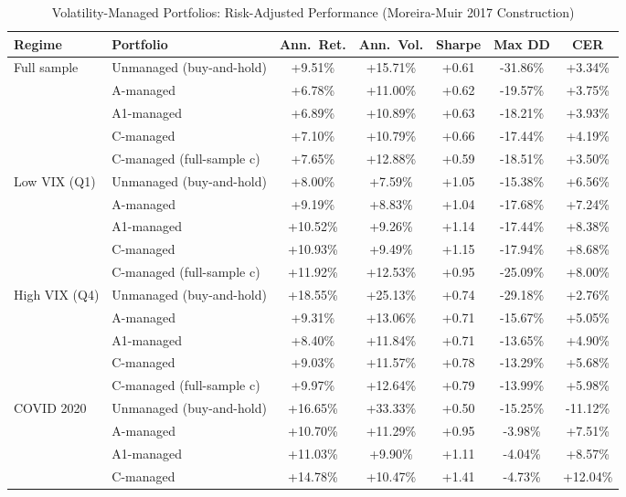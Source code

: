 
\begin{table}[htbp]
\centering
\caption{Volatility-Managed Portfolios: Risk-Adjusted Performance (Moreira-Muir 2017 Construction)}
\label{tab:volmanaged}
\small
\begin{tabular}{llccccc}
\toprule
Regime & Portfolio & Ann.\ Ret. & Ann.\ Vol. & Sharpe & Max DD & CER \\
\midrule
Full sample & Unmanaged (buy-and-hold) & +9.51\% & +15.71\% & +0.61 & -31.86\% & +3.34\% \\
 & A-managed & +6.78\% & +11.00\% & +0.62 & -19.57\% & +3.75\% \\
 & A1-managed & +6.89\% & +10.89\% & +0.63 & -18.21\% & +3.93\% \\
 & C-managed & +7.10\% & +10.79\% & +0.66 & -17.44\% & +4.19\% \\
 & C-managed (full-sample c) & +7.65\% & +12.88\% & +0.59 & -18.51\% & +3.50\% \\
\midrule
Low VIX (Q1) & Unmanaged (buy-and-hold) & +8.00\% & +7.59\% & +1.05 & -15.38\% & +6.56\% \\
 & A-managed & +9.19\% & +8.83\% & +1.04 & -17.68\% & +7.24\% \\
 & A1-managed & +10.52\% & +9.26\% & +1.14 & -17.44\% & +8.38\% \\
 & C-managed & +10.93\% & +9.49\% & +1.15 & -17.94\% & +8.68\% \\
 & C-managed (full-sample c) & +11.92\% & +12.53\% & +0.95 & -25.09\% & +8.00\% \\
\midrule
High VIX (Q4) & Unmanaged (buy-and-hold) & +18.55\% & +25.13\% & +0.74 & -29.18\% & +2.76\% \\
 & A-managed & +9.31\% & +13.06\% & +0.71 & -15.67\% & +5.05\% \\
 & A1-managed & +8.40\% & +11.84\% & +0.71 & -13.65\% & +4.90\% \\
 & C-managed & +9.03\% & +11.57\% & +0.78 & -13.29\% & +5.68\% \\
 & C-managed (full-sample c) & +9.97\% & +12.64\% & +0.79 & -13.99\% & +5.98\% \\
\midrule
COVID 2020 & Unmanaged (buy-and-hold) & +16.65\% & +33.33\% & +0.50 & -15.25\% & -11.12\% \\
 & A-managed & +10.70\% & +11.29\% & +0.95 & -3.98\% & +7.51\% \\
 & A1-managed & +11.03\% & +9.90\% & +1.11 & -4.04\% & +8.57\% \\
 & C-managed & +14.78\% & +10.47\% & +1.41 & -4.73\% & +12.04\% \\

\end{tabular}
\end{table}
